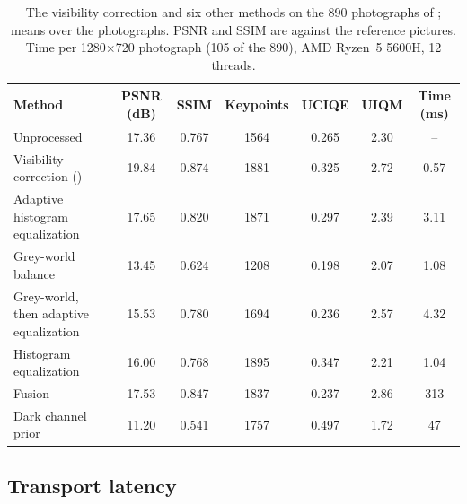 \begin{table}[!t]
  \centering\small
  \caption{The visibility correction and six other methods on the 890
    photographs of \cite{li2020uieb}; means over the photographs. PSNR and SSIM
    are against the reference pictures. Time per 1280$\times$720 photograph
    (105 of the 890), AMD Ryzen~5 5600H, 12 threads.}\label{tab:uieb}
  \setlength{\tabcolsep}{4pt}
  \begin{tabular}{@{}L{6.4cm}cccccc@{}}
    \toprule
    Method & PSNR (dB) & SSIM & Keypoints & UCIQE & UIQM & Time (ms) \\
    \midrule
    Unprocessed & 17.36 & 0.767 & 1564 & 0.265 & 2.30 & -- \\
    Visibility correction (\eeye{}) & 19.84 & 0.874 & 1881 & 0.325 & 2.72 & 0.57 \\
    Adaptive histogram equalization & 17.65 & 0.820 & 1871 & 0.297 & 2.39 & 3.11 \\
    Grey-world balance & 13.45 & 0.624 & 1208 & 0.198 & 2.07 & 1.08 \\
    Grey-world, then adaptive equalization & 15.53 & 0.780 & 1694 & 0.236 & 2.57 & 4.32 \\
    Histogram equalization & 16.00 & 0.768 & 1895 & 0.347 & 2.21 & 1.04 \\
    Fusion \cite{ancuti2018} & 17.53 & 0.847 & 1837 & 0.237 & 2.86 & 313 \\
    Dark channel prior \cite{drews2013} & 11.20 & 0.541 & 1757 & 0.497 & 1.72 & 47 \\
    \bottomrule
  \end{tabular}
\end{table}

\subsection{Transport latency}\label{sec:res-latency}

